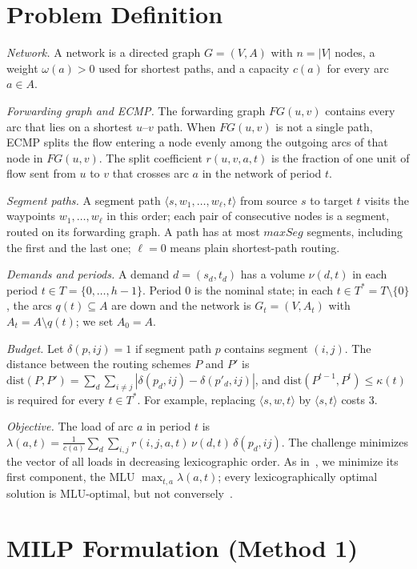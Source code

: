 \documentclass[conference]{IEEEtran}
\begin{document}
\section{Problem Definition}\label{sec:problem}

\emph{Network.} A network is a directed graph $G=(V,A)$ with $n=|V|$ nodes, a weight $\omega(a)>0$ used for shortest paths, and a capacity $c(a)$ for every arc $a\in A$.

\emph{Forwarding graph and ECMP.} The forwarding graph $FG(u,v)$ contains every arc that lies on a shortest $u$--$v$ path. When $FG(u,v)$ is not a single path, ECMP splits the flow entering a node evenly among the outgoing arcs of that node in $FG(u,v)$. The split coefficient $r(u,v,a,t)$ is the fraction of one unit of flow sent from $u$ to $v$ that crosses arc $a$ in the network of period $t$.

\emph{Segment paths.} A segment path $\langle s,w_1,\dots,w_\ell,t\rangle$ from source $s$ to target $t$ visits the waypoints $w_1,\dots,w_\ell$ in this order; each pair of consecutive nodes is a segment, routed on its forwarding graph. A path has at most $maxSeg$ segments, including the first and the last one; $\ell=0$ means plain shortest-path routing.

\emph{Demands and periods.} A demand $d=(s_d,t_d)$ has a volume $\nu(d,t)$ in each period $t\in T=\{0,\dots,h-1\}$. Period 0 is the nominal state; in each $t\in T^*=T\setminus\{0\}$, the arcs $q(t)\subseteq A$ are down and the network is $G_t=(V,A_t)$ with $A_t=A\setminus q(t)$; we set $A_0=A$.

\emph{Budget.} Let $\delta(p,ij)=1$ if segment path $p$ contains segment $(i,j)$. The distance between the routing schemes $P$ and $P'$ is $\mathrm{dist}(P,P')=\sum_d\sum_{i\neq j}|\delta(p_d,ij)-\delta(p'_d,ij)|$, and $\mathrm{dist}(P^{t-1},P^t)\le\kappa(t)$ is required for every $t\in T^*$. For example, replacing $\langle s,w,t\rangle$ by $\langle s,t\rangle$ costs 3.

\emph{Objective.} The load of arc $a$ in period $t$ is $\lambda(a,t)=\frac{1}{c(a)}\sum_d\sum_{i,j} r(i,j,a,t)\,\nu(d,t)\,\delta(p_d,ij)$. The challenge minimizes the vector of all loads in decreasing lexicographic order. As in~\cite{jaumard2026}, we minimize its first component, the MLU $\max_{t,a}\lambda(a,t)$; every lexicographically optimal solution is MLU-optimal, but not conversely~\cite{benhamiche2026}.

\section{MILP Formulation (Method 1)}\label{sec:milp}
\end{document}
